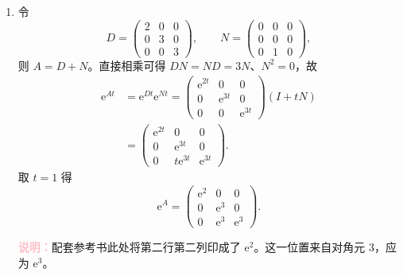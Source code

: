 \documentclass[UTF8,a4paper,11pt]{ctexart}
\newcommand{\e}{\mathrm e}
\newcommand{\note}[1]{\par\smallskip\noindent\textcolor{pink}{\bfseries 说明：}#1\par\smallskip}
\begin{document}
\begin{solution}
\begin{enumerate}[label=(\arabic*)]
\item 令
\[
D=\begin{pmatrix}2&0&0\\0&3&0\\0&0&3\end{pmatrix},\qquad
N=\begin{pmatrix}0&0&0\\0&0&0\\0&1&0\end{pmatrix},
\]
则 $A=D+N$。直接相乘可得 $DN=ND=3N$、$N^2=0$，故
\[
\begin{aligned}
\e^{At}&=\e^{Dt}\e^{Nt}
=\begin{pmatrix}\e^{2t}&0&0\\0&\e^{3t}&0\\0&0&\e^{3t}\end{pmatrix}(I+tN)\\[4pt]
&=\begin{pmatrix}\e^{2t}&0&0\\0&\e^{3t}&0\\0&t\e^{3t}&\e^{3t}\end{pmatrix}.
\end{aligned}
\]
取 $t=1$ 得
\[
\boxed{\e^A=\begin{pmatrix}\e^2&0&0\\0&\e^3&0\\0&\e^3&\e^3\end{pmatrix}.}
\]
\note{配套参考书此处将第二行第二列印成了 $\e^2$。这一位置来自对角元 $3$，应为 $\e^3$。}
\end{enumerate}
\end{solution}
\end{document}
